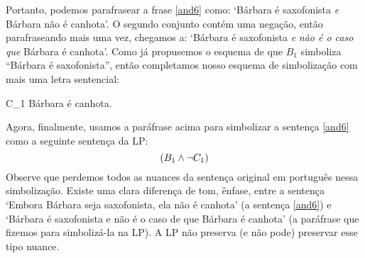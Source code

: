 Portanto, podemos parafrasear a frase \ref{and6} como: `Bárbara é saxofonista \emph{e} Bárbara não é canhota'.
O segundo conjunto contém uma negação, então parafraseando mais uma vez, chegamos a: `Bárbara é saxofonista \emph{e} \emph{não é o caso que} Bárbara é canhota'.
Como já propusemos o esquema de que $B_1$ simboliza ``Bárbara é saxofonista'', então completamos nosso esquema de simbolização com mais uma letra sentencial:
	\begin{ekey}
		\item[C_1] Bárbara é canhota.
	\end{ekey}
Agora, finalmente, usamos a paráfrase acima para simbolizar a sentença \ref{and6} como a seguinte sentença da LP:
$$(B_1 \wedge \neg C_1)$$
Observe que perdemos todos as nuances da sentença original em português nessa simbolização.
Existe uma clara diferença de tom, ênfase, entre a sentença `Embora Bárbara seja saxofonista, ela não é canhota' (a sentença \ref{and6}) e `Bárbara é saxofonista e não é o caso de que Bárbara é canhota' (a paráfrase que fizemos para simbolizá-la na LP).
A LP não preserva (e não pode) preservar esse tipo nuance.

